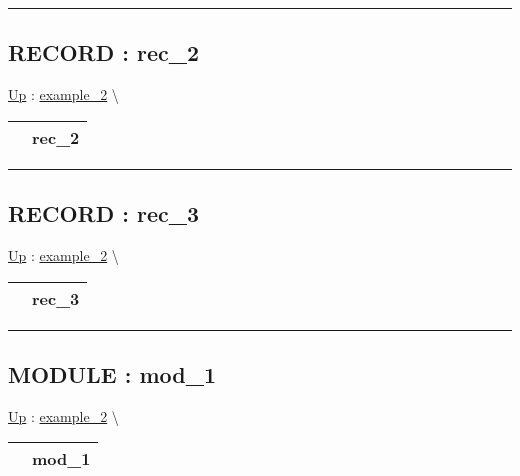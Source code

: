 \par


\rule{\linewidth}{0.5pt}
\subsection*{RECORD : rec\_2}
\hypertarget{ecldoc:example_2.rec_2}{}
\hyperlink{ecldoc:example_2}{Up} :
\hspace{0pt} \hyperlink{ecldoc:example_2}{example_2} \textbackslash 

{\renewcommand{\arraystretch}{1.5}
\begin{tabularx}{\textwidth}{|>{\raggedright\arraybackslash}l|X|}
\hline
\hspace{0pt} & rec\_2 \\
\hline
\end{tabularx}
}

\par


\rule{\linewidth}{0.5pt}
\subsection*{RECORD : rec\_3}
\hypertarget{ecldoc:example_2.rec_3}{}
\hyperlink{ecldoc:example_2}{Up} :
\hspace{0pt} \hyperlink{ecldoc:example_2}{example_2} \textbackslash 

{\renewcommand{\arraystretch}{1.5}
\begin{tabularx}{\textwidth}{|>{\raggedright\arraybackslash}l|X|}
\hline
\hspace{0pt} & rec\_3 \\
\hline
\end{tabularx}
}

\par


\rule{\linewidth}{0.5pt}
\subsection*{MODULE : mod\_1}
\hypertarget{ecldoc:example_2.mod_1}{}
\hyperlink{ecldoc:example_2}{Up} :
\hspace{0pt} \hyperlink{ecldoc:example_2}{example_2} \textbackslash 

{\renewcommand{\arraystretch}{1.5}
\begin{tabularx}{\textwidth}{|>{\raggedright\arraybackslash}l|X|}
\hline
\hspace{0pt} & mod\_1 \\
\hline
\end{tabularx}
}


